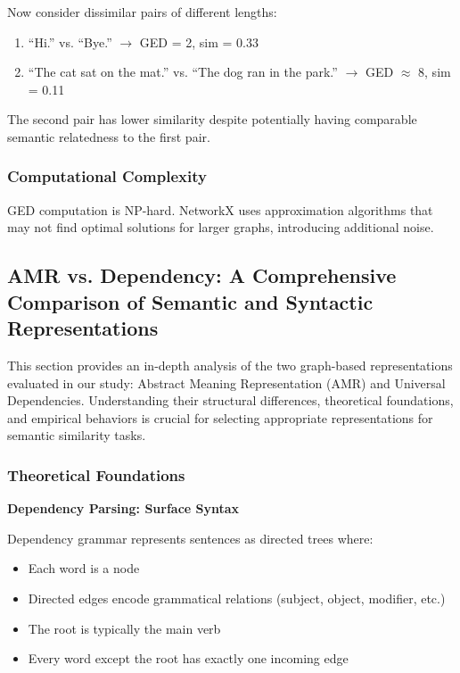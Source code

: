 \documentclass[11pt,a4paper]{article}
\begin{document}
Now consider dissimilar pairs of different lengths:
\begin{enumerate}
    \item ``Hi.'' vs. ``Bye.'' $\to$ GED = 2, sim = 0.33
    \item ``The cat sat on the mat.'' vs. ``The dog ran in the park.'' $\to$ GED $\approx$ 8, sim = 0.11
\end{enumerate}

The second pair has lower similarity despite potentially having comparable semantic relatedness to the first pair.

\subsubsection{Computational Complexity}

GED computation is NP-hard. NetworkX uses approximation algorithms that may not find optimal solutions for larger graphs, introducing additional noise.

\subsection{AMR vs. Dependency: A Comprehensive Comparison of Semantic and Syntactic Representations}

This section provides an in-depth analysis of the two graph-based representations evaluated in our study: Abstract Meaning Representation (AMR) and Universal Dependencies. Understanding their structural differences, theoretical foundations, and empirical behaviors is crucial for selecting appropriate representations for semantic similarity tasks.

\subsubsection{Theoretical Foundations}

\textbf{Dependency Parsing: Surface Syntax}

Dependency grammar represents sentences as directed trees where:
\begin{itemize}
    \item Each word is a node
    \item Directed edges encode grammatical relations (subject, object, modifier, etc.)
    \item The root is typically the main verb
    \item Every word except the root has exactly one incoming edge
\end{itemize}
\end{document}
